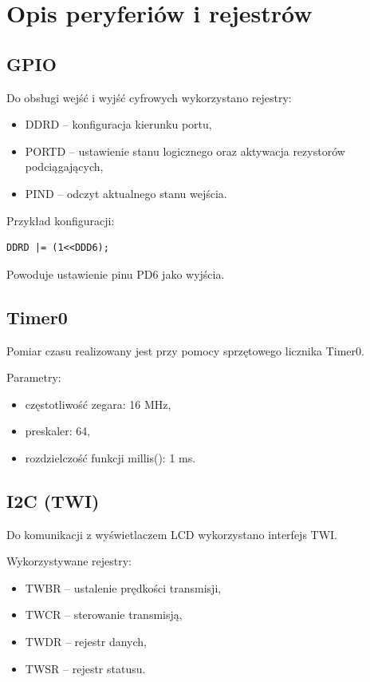 \documentclass[a4paper,12pt]{article}
\begin{document}
\section{Opis peryferiów i rejestrów}

\subsection{GPIO}

Do obsługi wejść i wyjść cyfrowych wykorzystano rejestry:

\begin{itemize}
\item DDRD -- konfiguracja kierunku portu,
\item PORTD -- ustawienie stanu logicznego oraz aktywacja rezystorów podciągających,
\item PIND -- odczyt aktualnego stanu wejścia.
\end{itemize}

Przykład konfiguracji:

\begin{verbatim}
DDRD |= (1<<DDD6);
\end{verbatim}

Powoduje ustawienie pinu PD6 jako wyjścia.

\subsection{Timer0}

Pomiar czasu realizowany jest przy pomocy sprzętowego licznika Timer0.

Parametry:

\begin{itemize}
\item częstotliwość zegara: 16 MHz,
\item preskaler: 64,
\item rozdzielczość funkcji millis(): 1 ms.
\end{itemize}

\subsection{I2C (TWI)}

Do komunikacji z wyświetlaczem LCD wykorzystano interfejs TWI.

Wykorzystywane rejestry:

\begin{itemize}
\item TWBR -- ustalenie prędkości transmisji,
\item TWCR -- sterowanie transmisją,
\item TWDR -- rejestr danych,
\item TWSR -- rejestr statusu.
\end{itemize}
\end{document}
